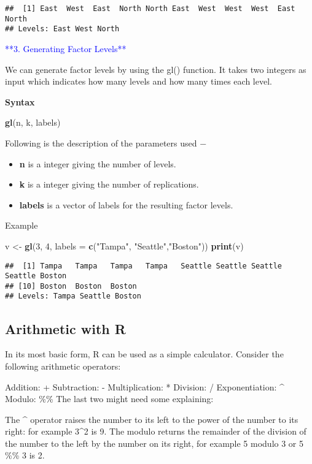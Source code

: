 \documentclass[
]{article}
\newenvironment{Shaded}{\begin{snugshade}}{\end{snugshade}}
\newcommand{\AttributeTok}[1]{\textcolor[rgb]{0.13,0.29,0.53}{#1}}
\newcommand{\DecValTok}[1]{\textcolor[rgb]{0.00,0.00,0.81}{#1}}
\newcommand{\FunctionTok}[1]{\textcolor[rgb]{0.13,0.29,0.53}{\textbf{#1}}}
\newcommand{\NormalTok}[1]{#1}
\newcommand{\OtherTok}[1]{\textcolor[rgb]{0.56,0.35,0.01}{#1}}
\newcommand{\StringTok}[1]{\textcolor[rgb]{0.31,0.60,0.02}{#1}}
\providecommand{\tightlist}{%
  \setlength{\itemsep}{0pt}\setlength{\parskip}{0pt}}
\begin{document}
\begin{verbatim}
##  [1] East  West  East  North North East  West  West  West  East  North
## Levels: East West North
\end{verbatim}

\textcolor{blue}{**3. Generating Factor Levels**}

We can generate factor levels by using the gl() function. It takes two
integers as input which indicates how many levels and how many times
each level.

\textbf{Syntax}

\begin{Shaded}
\begin{Highlighting}[]
\FunctionTok{gl}\NormalTok{(n, k, labels)}
\end{Highlighting}
\end{Shaded}

Following is the description of the parameters used −

\begin{itemize}
\tightlist
\item
  \textbf{n} is a integer giving the number of levels.
\item
  \textbf{k} is a integer giving the number of replications.
\item
  \textbf{labels} is a vector of labels for the resulting factor levels.
\end{itemize}

Example

\begin{Shaded}
\begin{Highlighting}[]
\NormalTok{v }\OtherTok{\textless{}{-}} \FunctionTok{gl}\NormalTok{(}\DecValTok{3}\NormalTok{, }\DecValTok{4}\NormalTok{, }\AttributeTok{labels =} \FunctionTok{c}\NormalTok{(}\StringTok{"Tampa"}\NormalTok{, }\StringTok{"Seattle"}\NormalTok{,}\StringTok{"Boston"}\NormalTok{))}
\FunctionTok{print}\NormalTok{(v)}
\end{Highlighting}
\end{Shaded}

\begin{verbatim}
##  [1] Tampa   Tampa   Tampa   Tampa   Seattle Seattle Seattle Seattle Boston 
## [10] Boston  Boston  Boston 
## Levels: Tampa Seattle Boston
\end{verbatim}

\hypertarget{arithmetic-with-r}{%
\subsection{Arithmetic with R}\label{arithmetic-with-r}}

In its most basic form, R can be used as a simple calculator. Consider
the following arithmetic operators:

Addition: + Subtraction: - Multiplication: * Division: / Exponentiation:
\^{} Modulo: \%\% The last two might need some explaining:

The \^{} operator raises the number to its left to the power of the
number to its right: for example 3\^{}2 is 9. The modulo returns the
remainder of the division of the number to the left by the number on its
right, for example 5 modulo 3 or 5 \%\% 3 is 2.
\end{document}
